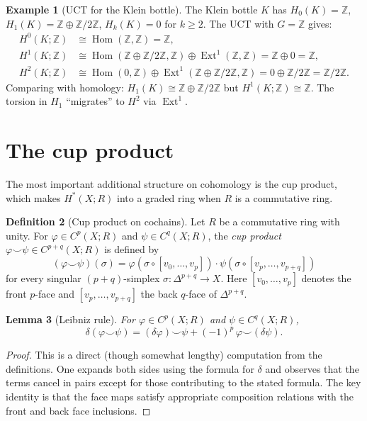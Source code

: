 \documentclass[12pt,a4paper,openany]{book}
\theoremstyle{definition}
\newtheorem{definition}{Definition}[chapter]
\newtheorem{example}[definition]{Example}
\theoremstyle{plain}
\newtheorem{lemma}[definition]{Lemma}
\theoremstyle{remark}
\newcommand{\Z}{\mathbb{Z}}
\DeclareMathOperator{\Hom}{Hom}
\begin{document}
\begin{example}[UCT for the Klein bottle]
The Klein bottle $K$ has $H_0(K)=\Z$, $H_1(K)=\Z\oplus\Z/2\Z$,
$H_k(K)=0$ for $k\geq 2$. The UCT with $G=\Z$ gives:
\begin{align*}
  H^0(K;\Z) &\cong \Hom(\Z,\Z) = \Z,\\
  H^1(K;\Z) &\cong \Hom(\Z\oplus\Z/2\Z,\Z)\oplus\operatorname{Ext}^1(\Z,\Z)
    = \Z\oplus 0 = \Z,\\
  H^2(K;\Z) &\cong \Hom(0,\Z)\oplus\operatorname{Ext}^1(\Z\oplus\Z/2\Z,\Z)
    = 0\oplus\Z/2\Z = \Z/2\Z.
\end{align*}
Comparing with homology: $H_1(K)\cong\Z\oplus\Z/2\Z$ but
$H^1(K;\Z)\cong\Z$. The torsion in $H_1$ ``migrates'' to $H^2$
via $\operatorname{Ext}^1$.
\end{example}

\section{The cup product}
\label{sec:cup-product}

The most important additional structure on cohomology is the cup product,
which makes $H^*(X;R)$ into a graded ring when $R$ is a commutative ring.

\begin{definition}[Cup product on cochains]
Let $R$ be a commutative ring with unity. For
$\varphi\in C^p(X;R)$ and $\psi\in C^q(X;R)$, the
\emph{cup product} $\varphi\smile\psi\in C^{p+q}(X;R)$ is defined by
\[
  (\varphi\smile\psi)(\sigma)
  = \varphi(\sigma\circ[v_0,\ldots,v_p])\cdot\psi(\sigma\circ[v_p,\ldots,v_{p+q}])
\]
for every singular $(p+q)$-simplex $\sigma\colon\Delta^{p+q}\to X$.
Here $[v_0,\ldots,v_p]$ denotes the front $p$-face and
$[v_p,\ldots,v_{p+q}]$ the back $q$-face of $\Delta^{p+q}$.
\end{definition}

\begin{lemma}[Leibniz rule]\label{lem:leibniz-cup}
For $\varphi\in C^p(X;R)$ and $\psi\in C^q(X;R)$,
\[
  \delta(\varphi\smile\psi)
  = (\delta\varphi)\smile\psi + (-1)^p\,\varphi\smile(\delta\psi).
\]
\end{lemma}

\begin{proof}
This is a direct (though somewhat lengthy) computation from the
definitions. One expands both sides using the formula for $\delta$ and
observes that the terms cancel in pairs except for those contributing
to the stated formula. The key identity is that the face maps satisfy
appropriate composition relations with the front and back face
inclusions.
\end{proof}
\end{document}
